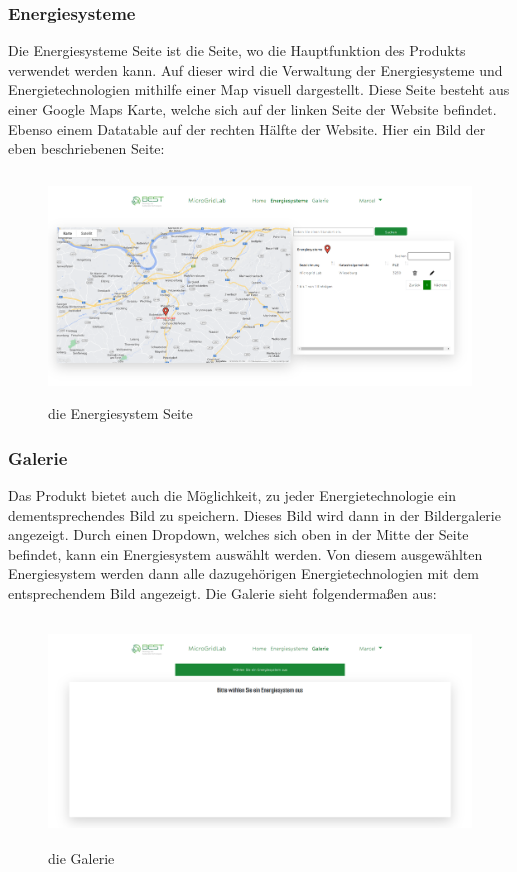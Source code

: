 \subsubsection{Energiesysteme}
Die Energiesysteme Seite ist die Seite, wo die Hauptfunktion des Produkts verwendet werden kann. Auf dieser wird die Verwaltung der Energiesysteme und Energietechnologien mithilfe einer Map visuell dargestellt. Diese Seite besteht aus einer Google Maps Karte, welche sich auf der linken Seite der Website befindet. Ebenso einem Datatable auf der rechten Hälfte der Website. Hier ein Bild der eben beschriebenen Seite:
\begin{figure}[h]
	\centering
	\includegraphics[height=6cm,width=14cm]{images/EnergiesystemSeite}
	\caption{die Energiesystem Seite}
	\label{fig:Energiesystem Seite}
\end{figure}
\newpage

\subsubsection{Galerie}
Das Produkt bietet auch die Möglichkeit, zu jeder Energietechnologie ein dementsprechendes Bild zu speichern. Dieses Bild wird dann in der Bildergalerie angezeigt. Durch einen Dropdown, welches sich oben in der Mitte der Seite befindet, kann ein Energiesystem auswählt werden. Von diesem ausgewählten Energiesystem werden dann alle dazugehörigen Energietechnologien mit dem entsprechendem Bild angezeigt. Die Galerie sieht folgendermaßen aus:
\begin{figure}[h]
	\centering
	\includegraphics[height=6cm,width=14cm]{images/GalerieSeite}
	\caption{die Galerie}
	\label{fig:Galerie}
\end{figure}


